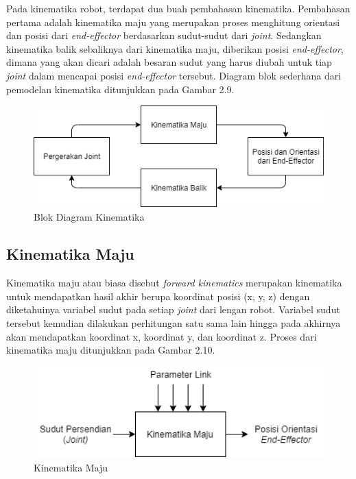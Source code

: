 Pada kinematika robot, terdapat dua buah pembahasan kinematika. Pembahasan pertama adalah kinematika maju yang merupakan proses menghitung orientasi dan posisi dari\textit{ end-effector} berdasarkan sudut-sudut dari \textit{joint}.  Sedangkan kinematika balik sebaliknya dari kinematika maju, diberikan posisi \textit{end-effector}, dimana yang akan dicari adalah besaran sudut yang harus diubah untuk tiap \textit{joint} dalam mencapai posisi \textit{end-effector} tersebut. Diagram blok sederhana dari pemodelan kinematika ditunjukkan pada Gambar 2.9.
	\begin{figure}[H]
	\centering
	\includegraphics[width=12cm]{gambar/kinematika_diagram.png}
	\caption{Blok Diagram Kinematika}
\end{figure}

\subsection{Kinematika Maju}
Kinematika maju atau biasa disebut \textit{forward kinematics} merupakan kinematika untuk mendapatkan hasil akhir berupa koordinat posisi (x, y, z) dengan diketahuinya variabel sudut pada setiap \textit{joint} dari lengan robot.  Variabel sudut tersebut kemudian dilakukan perhitungan satu sama lain hingga pada akhirnya akan mendapatkan koordinat x, koordinat y, dan koordinat z. Proses dari kinematika maju ditunjukkan pada Gambar 2.10.
	\begin{figure}[H]
	\centering
	\includegraphics[width=12cm]{gambar/Kinematika_maju.png}
	\caption{Kinematika Maju}
\end{figure}


